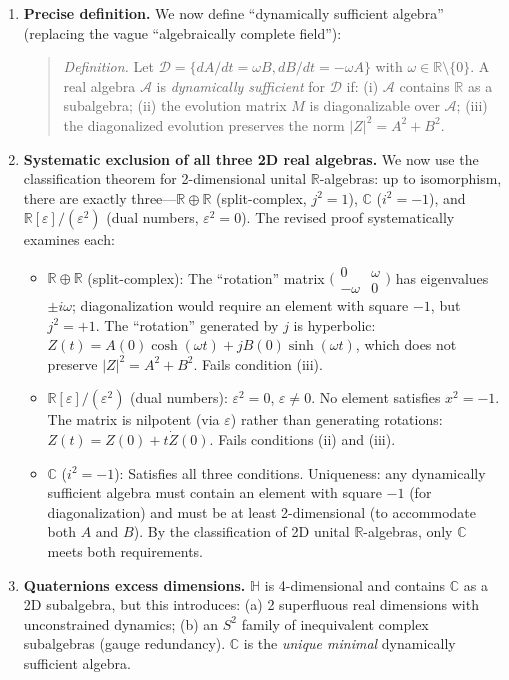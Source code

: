 \documentclass[11pt,a4paper]{article}
\begin{document}
\begin{enumerate}[leftmargin=*]
\item \textbf{Precise definition.} We now define ``dynamically sufficient algebra'' (replacing the vague ``algebraically complete field''):
\begin{quote}
\emph{Definition.} Let $\mathcal{D} = \{dA/dt = \omega B, dB/dt = -\omega A\}$ with $\omega \in \mathbb{R}\setminus\{0\}$. A real algebra $\mathcal{A}$ is \emph{dynamically sufficient} for $\mathcal{D}$ if: (i) $\mathcal{A}$ contains $\mathbb{R}$ as a subalgebra; (ii) the evolution matrix $M$ is diagonalizable over $\mathcal{A}$; (iii) the diagonalized evolution preserves the norm $|Z|^2 = A^2 + B^2$.
\end{quote}

\item \textbf{Systematic exclusion of all three 2D real algebras.} We now use the classification theorem for 2-dimensional unital $\mathbb{R}$-algebras: up to isomorphism, there are exactly three---$\mathbb{R} \oplus \mathbb{R}$ (split-complex, $j^2=1$), $\mathbb{C}$ ($i^2=-1$), and $\mathbb{R}[\varepsilon]/(\varepsilon^2)$ (dual numbers, $\varepsilon^2=0$). The revised proof systematically examines each:
\begin{itemize}
\item $\mathbb{R} \oplus \mathbb{R}$ (split-complex): The ``rotation'' matrix $\bigl(\begin{smallmatrix}0 & \omega \\ -\omega & 0\end{smallmatrix}\bigr)$ has eigenvalues $\pm i\omega$; diagonalization would require an element with square $-1$, but $j^2 = +1$. The ``rotation'' generated by $j$ is hyperbolic: $Z(t) = A(0)\cosh(\omega t) + j B(0)\sinh(\omega t)$, which does not preserve $|Z|^2 = A^2 + B^2$. Fails condition (iii).
\item $\mathbb{R}[\varepsilon]/(\varepsilon^2)$ (dual numbers): $\varepsilon^2 = 0$, $\varepsilon \neq 0$. No element satisfies $x^2 = -1$. The matrix is nilpotent (via $\varepsilon$) rather than generating rotations: $Z(t) = Z(0) + t\dot{Z}(0)$. Fails conditions (ii) and (iii).
\item $\mathbb{C}$ ($i^2 = -1$): Satisfies all three conditions. Uniqueness: any dynamically sufficient algebra must contain an element with square $-1$ (for diagonalization) and must be at least 2-dimensional (to accommodate both $A$ and $B$). By the classification of 2D unital $\mathbb{R}$-algebras, only $\mathbb{C}$ meets both requirements.
\end{itemize}

\item \textbf{Quaternions excess dimensions.} $\mathbb{H}$ is 4-dimensional and contains $\mathbb{C}$ as a 2D subalgebra, but this introduces: (a) 2 superfluous real dimensions with unconstrained dynamics; (b) an $S^2$ family of inequivalent complex subalgebras (gauge redundancy). $\mathbb{C}$ is the \emph{unique minimal} dynamically sufficient algebra.
\end{enumerate}
\end{document}
